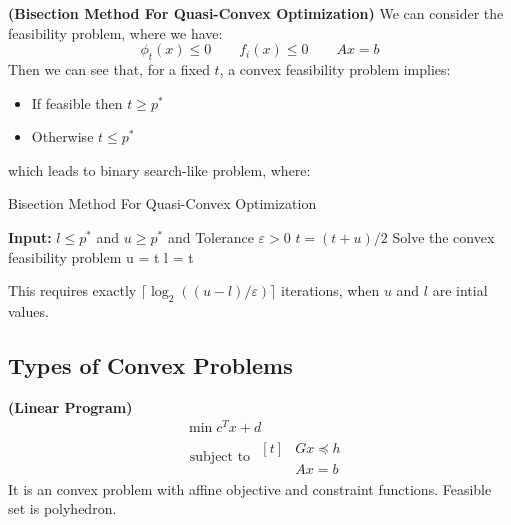 \begin{definition}{\textbf{(Bisection Method For Quasi-Convex Optimization)}}
    We can consider the feasibility problem, where we have:
    \begin{equation*}
        \phi_t(x)\le0 \qquad f_i(x)\le0 \qquad Ax=b
    \end{equation*}
    Then we can see that, for a fixed $t$, a convex feasibility problem implies: 
    \begin{itemize}
        \item If feasible then $t\ge p^*$
        \item Otherwise $t\le p^*$
    \end{itemize}
    which leads to binary search-like problem, where:
    \begin{algorithm}[H]
        \caption{Bisection Method For Quasi-Convex Optimization}
        \begin{algorithmic}[1]
            \State \textbf{Input: } $l\le p^*$ and $u\ge p^*$ and Tolerance $\varepsilon>0$
                \State $t = (t+u)/2$
                \State Solve the convex feasibility problem
                    \State u = t
                \Else
                    \State l = t
                \EndIf
            \EndWhile
    	\end{algorithmic} 
    \end{algorithm}
    This requires exactly $\lceil \log_2((u-l)/\varepsilon)\rceil$ iterations, when $u$ and $l$ are intial values. 
\end{definition}

\subsection{Types of Convex Problems}

\begin{definition}{\textbf{(Linear Program)}}
    \begin{equation*}
    \begin{aligned}
        &\min c^Tx+d \\
        &\text{ subject to } \begin{aligned}[t]
            &Gx\preceq h\\
            &Ax=b
        \end{aligned}
    \end{aligned}
    \end{equation*}
    It is an convex problem with affine objective and constraint functions. Feasible set is polyhedron.
\end{definition}

